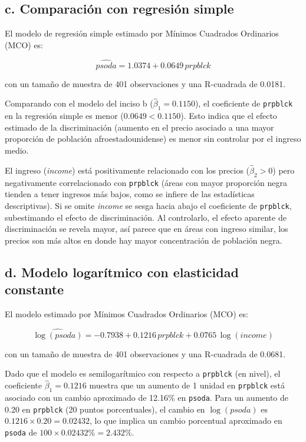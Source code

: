 \documentclass[12pt]{article}
\begin{document}
\subsection*{c. Comparación con regresión simple}

El modelo de regresión simple estimado por Mínimos Cuadrados Ordinarios (MCO) es:

\[
\widehat{psoda} = 1.0374 + 0.0649 \, prpblck
\]

con un tamaño de muestra de 401 observaciones y una R-cuadrada de 0.0181.

Comparando con el modelo del inciso b (\(\hat{\beta}_1 = 0.1150\)), el coeficiente de \texttt{prpblck} en la regresión simple es menor ($0.0649 < 0.1150$). Esto indica que el efecto estimado de la discriminación (aumento en el precio asociado a una mayor proporción de población afroestadounidense) es menor sin controlar por el ingreso medio. 

El ingreso (\textit{income}) está positivamente relacionado con los precios (\(\hat{\beta}_2 > 0\)) pero negativamente correlacionado con \texttt{prpblck} (áreas con mayor proporción negra tienden a tener ingresos más bajos, como se infiere de las estadísticas descriptivas). Si se omite \textit{income} se sesga hacia abajo el coeficiente de \texttt{prpblck}, subestimando el efecto de discriminación. Al controlarlo, el efecto aparente de discriminación se revela mayor, así parece que en áreas con ingreso similar, los precios son más altos en donde hay mayor concentración de población negra.

\subsection*{d. Modelo logarítmico con elasticidad constante}

El modelo estimado por Mínimos Cuadrados Ordinarios (MCO) es:

\[
\widehat{\log(psoda)} = -0.7938 + 0.1216 \, prpblck + 0.0765 \, \log(income)
\]

con un tamaño de muestra de 401 observaciones y una R-cuadrada de 0.0681.

Dado que el modelo es semilogarítmico con respecto a \texttt{prpblck} (en nivel), el coeficiente \(\hat{\beta}_1 = 0.1216\) muestra que un aumento de 1 unidad en \texttt{prpblck} está asociado con un cambio aproximado de 12.16\% en \texttt{psoda}. Para un aumento de 0.20 en \texttt{prpblck} (20 puntos porcentuales), el cambio en \(\log(psoda)\) es \(0.1216 \times 0.20 = 0.02432\), lo que implica un cambio porcentual aproximado en \texttt{psoda} de \(100 \times 0.02432 \% = 2.432\%\).
\end{document}
